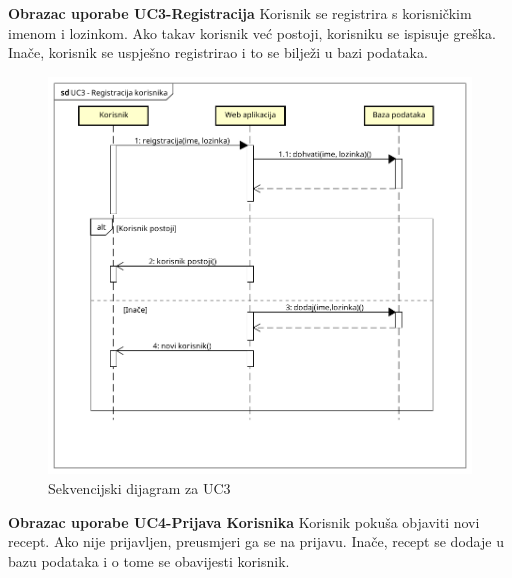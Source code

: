 				\noindent
				\textbf{Obrazac uporabe UC3-Registracija}\newline
					{Korisnik se registrira s korisničkim imenom i lozinkom. Ako takav korisnik već postoji, korisniku se ispisuje greška. Inače, korisnik se uspješno registrirao i to se bilježi u bazi podataka.}
				

				\begin{figure}[H]
					\includegraphics[scale= 0.6]{slike/sekvencijski_dijagramUC3.png}
					\centering
					\caption{Sekvencijski dijagram za UC3}
					\label{fig:Sekvencijski dijagram za UC3}
				\end{figure}
				
				\eject

				\noindent
				\textbf{Obrazac uporabe UC4-Prijava Korisnika}\newline
					{Korisnik pokuša objaviti novi recept. Ako nije prijavljen, preusmjeri ga se na prijavu. Inače, recept se dodaje u bazu podataka i o tome se obavijesti korisnik.}
				

